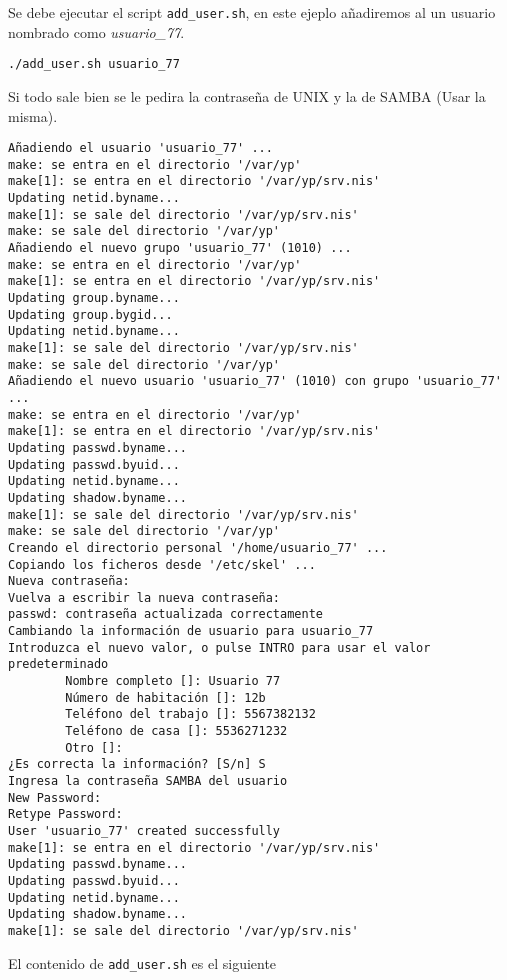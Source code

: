 \documentclass[../main.tex]{subfiles}
\begin{document}
Se debe ejecutar el script \lstinline|add_user.sh|,
en este ejeplo añadiremos al un usuario nombrado como
\textit{usuario\_77}.

\begin{lstlisting}
./add_user.sh usuario_77
\end{lstlisting}

Si todo sale bien se le pedira la contraseña de UNIX y
la de SAMBA (Usar la misma).

\begin{lstlisting}
Añadiendo el usuario 'usuario_77' ...
make: se entra en el directorio '/var/yp'
make[1]: se entra en el directorio '/var/yp/srv.nis'
Updating netid.byname...
make[1]: se sale del directorio '/var/yp/srv.nis'
make: se sale del directorio '/var/yp'
Añadiendo el nuevo grupo 'usuario_77' (1010) ...
make: se entra en el directorio '/var/yp'
make[1]: se entra en el directorio '/var/yp/srv.nis'
Updating group.byname...
Updating group.bygid...
Updating netid.byname...
make[1]: se sale del directorio '/var/yp/srv.nis'
make: se sale del directorio '/var/yp'
Añadiendo el nuevo usuario 'usuario_77' (1010) con grupo 'usuario_77' ...
make: se entra en el directorio '/var/yp'
make[1]: se entra en el directorio '/var/yp/srv.nis'
Updating passwd.byname...
Updating passwd.byuid...
Updating netid.byname...
Updating shadow.byname...
make[1]: se sale del directorio '/var/yp/srv.nis'
make: se sale del directorio '/var/yp'
Creando el directorio personal '/home/usuario_77' ...
Copiando los ficheros desde '/etc/skel' ...
Nueva contraseña:
Vuelva a escribir la nueva contraseña:
passwd: contraseña actualizada correctamente
Cambiando la información de usuario para usuario_77
Introduzca el nuevo valor, o pulse INTRO para usar el valor predeterminado
        Nombre completo []: Usuario 77
        Número de habitación []: 12b
        Teléfono del trabajo []: 5567382132
        Teléfono de casa []: 5536271232
        Otro []:
¿Es correcta la información? [S/n] S
Ingresa la contraseña SAMBA del usuario
New Password:
Retype Password:
User 'usuario_77' created successfully
make[1]: se entra en el directorio '/var/yp/srv.nis'
Updating passwd.byname...
Updating passwd.byuid...
Updating netid.byname...
Updating shadow.byname...
make[1]: se sale del directorio '/var/yp/srv.nis'
\end{lstlisting}

El contenido de \lstinline{add_user.sh} es el siguiente


\end{document}
